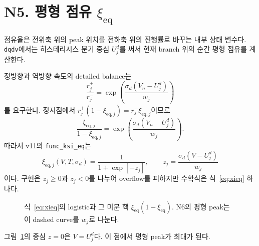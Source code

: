 \documentclass[11pt,a4paper]{article}
\newcommand{\eq}{\mathrm{eq}}
\begin{document}
\section{N5. 평형 점유 $\xi_{\eq}$}\label{sec:N5}
점유율은 전위축 위의 peak 위치를 전하축 위의 진행률로 바꾸는 내부 상태 변수다. \texttt{dqdv}에서는 히스테리시스 분기 중심 $U_j^d$를 써서 현재 branch 위의 순간 평형 점유를 계산한다.

정방향과 역방향 속도의 detailed balance는
\begin{equation}
\frac{r_j^+}{r_j^-}=\exp\!\left(\frac{\sigma_d(V_n-U_j^d)}{w_j}\right)
\label{eq:db}
\end{equation}
를 요구한다. 정지점에서 $r_j^+(1-\xi_{\eq,j})=r_j^-\xi_{\eq,j}$이므로
\begin{equation}
\frac{\xi_{\eq,j}}{1-\xi_{\eq,j}}
=\exp\!\left(\frac{\sigma_d(V_n-U_j^d)}{w_j}\right).
\label{eq:logit}
\end{equation}
따라서 v11의 \texttt{func\_ksi\_eq}는
\begin{equation}
\boxed{\;\xi_{\eq,j}(V,T,\sigma_d)
=\frac{1}{1+\exp[-z_j]},\qquad
z_j=\frac{\sigma_d(V-U_j^d)}{w_j}\;}
\label{eq:xieq}
\end{equation}
이다. 구현은 $z_j\ge0$과 $z_j<0$를 나누어 overflow를 피하지만 수학식은 식~\eqref{eq:xieq} 하나다.

\begin{figure}[t]
\centering
{}
\caption{식~\eqref{eq:xieq}의 logistic과 그 미분 핵 $\xi_{\eq}(1-\xi_{\eq})$. N6의 평형 peak는 이 dashed curve를 $w_j$로 나눈다.}
\label{fig:logisticpeak}
\end{figure}

그림~\ref{fig:logisticpeak}의 중심 $z=0$은 $V=U_j^d$다. 이 점에서 평형 peak가 최대가 된다.

\end{document}
